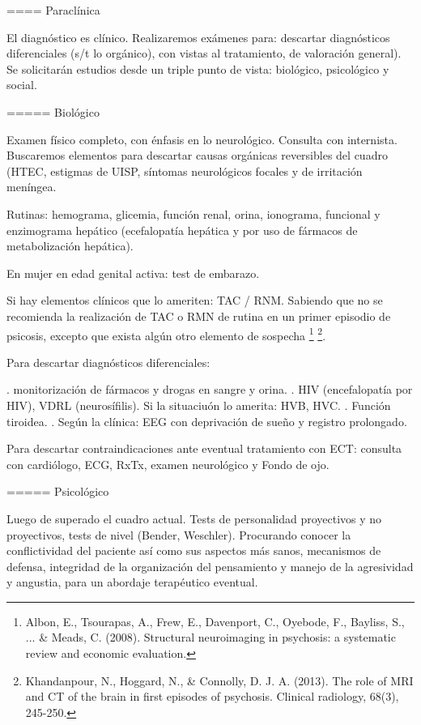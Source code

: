 ==== Paraclínica

El diagnóstico es clínico. Realizaremos exámenes para: descartar diagnósticos diferenciales (s/t lo orgánico), con vistas al tratamiento, de valoración general). Se solicitarán estudios desde un triple punto de vista: biológico, psicológico y social.

===== Biológico

Examen físico completo, con énfasis en lo neurológico. Consulta con internista. Buscaremos elementos para descartar causas orgánicas reversibles del cuadro (HTEC, estigmas de UISP, síntomas neurológicos focales y de irritación meníngea.

Rutinas: hemograma, glicemia, función renal, orina, ionograma, funcional y enzimograma hepático (ecefalopatía hepática y por uso de fármacos de metabolización hepática).

En mujer en edad genital activa: test de embarazo.

Si hay elementos clínicos que lo ameriten: TAC / RNM. Sabiendo que no se recomienda la realización de TAC o RMN de rutina en un primer episodio de psicosis, excepto que exista algún otro elemento de sospecha \footnote{Albon, E., Tsourapas, A., Frew, E., Davenport, C., Oyebode, F., Bayliss, S., ... \& Meads, C. (2008). Structural neuroimaging in psychosis: a systematic review and economic evaluation.} \footnote{Khandanpour, N., Hoggard, N., \& Connolly, D. J. A. (2013). The role of MRI and CT of the brain in first episodes of psychosis. Clinical radiology, 68(3), 245-250.}.

Para descartar diagnósticos diferenciales:

. monitorización de fármacos y drogas en sangre y orina.
. HIV (encefalopatía por HIV), VDRL (neurosífilis).  Si la situaciuón lo amerita: HVB, HVC.
. Función tiroidea.
. Según la clínica: EEG con deprivación de sueño y registro prolongado.

Para descartar contraindicaciones ante eventual tratamiento con ECT: consulta con cardiólogo, ECG, RxTx, examen neurológico y Fondo de ojo.

===== Psicológico

Luego de superado el cuadro actual. Tests de personalidad proyectivos y no proyectivos, tests de nivel (Bender, Weschler). Procurando conocer la conflictividad del paciente así como sus aspectos más sanos, mecanismos de defensa, integridad de la organización del pensamiento y manejo de la agresividad y angustia, para un abordaje terapéutico eventual.

